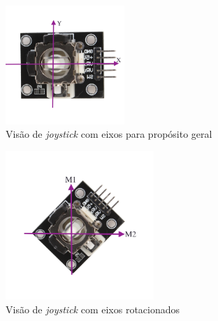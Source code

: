     \begin{figure}[!ht]
      \center
      \includegraphics[width=0.4\textwidth]{figuras/resultados/joy_xy}
      \caption{Visão de \textit{joystick} com eixos para propósito geral}
      \label{fig:joy_superior}
    \end{figure}

    \begin{figure}[!ht]
      \center
      \includegraphics[width=0.5\textwidth]{figuras/resultados/joy_m1m2}
      \caption{Visão de \textit{joystick} com eixos rotacionados}
      \label{fig:joy_m1m2}
    \end{figure}

